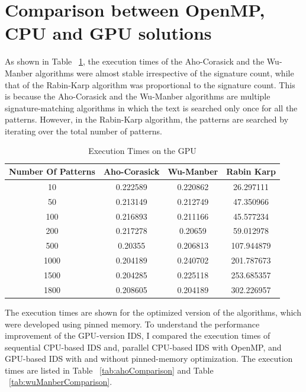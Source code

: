 \section{Comparison between OpenMP, CPU and GPU solutions}
As shown in Table ~\ref{tab:executionTimes}, the execution times of the Aho-Corasick and the Wu-Manber algorithms were almost stable irrespective of the signature count, while that of the Rabin-Karp algorithm was proportional to the signature count. This is because the Aho-Corasick and the Wu-Manber algorithms are multiple signature-matching algorithms in which the text is searched only once for all the patterns. However, in the Rabin-Karp algorithm, the patterns are searched by iterating over the total number of patterns. 

\begin {table}[H]
\centering
\caption {Execution Times on the GPU} \label{tab:executionTimes}
\begin{tabular}{|c|c|c|c|}
	\midrule
	Number Of Patterns &  Aho-Corasick &  Wu-Manber &  Rabin Karp\\
	\midrule
	10 & 0.222589    & 0.220862 &    26.297111\\
	\midrule
	50 &    0.213149 &    0.212749 &    47.350966\\
	\midrule
	100 &    0.216893 &    0.211166 &    45.577234\\
	\midrule
	200    & 0.217278 &    0.20659    & 59.012978\\
	\midrule
	500    & 0.20355 &    0.206813 &    107.944879\\
	\midrule
	1000 &    0.204189 &    0.240702 & 201.787673\\
	\midrule
	1500 &    0.204285 &    0.225118 &    253.685357\\
	\midrule
	1800 &    0.208605 &    0.204189 &    302.226957\\
	\midrule
\end{tabular}
\end{table}
\squeezeup
The execution times are shown for the optimized version of the algorithms, which were developed using pinned memory. To understand the performance improvement of the GPU-version IDS, I compared the execution times of sequential CPU-based IDS and, parallel CPU-based IDS with OpenMP, and GPU-based IDS with and without pinned-memory optimization. The execution times are listed in Table ~\ref{tab:ahoComparison} and Table ~\ref{tab:wuManberComparison}. 

